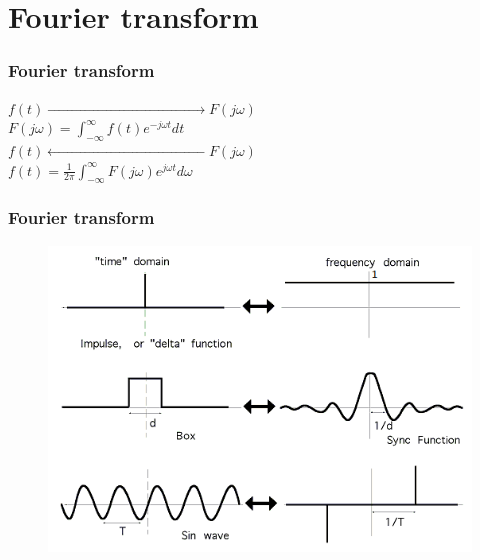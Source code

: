 \section{Fourier transform}

\begin{frame}
	\frametitle{Fourier transform}
	\vspace{-2ex}
	\begin{center}
		\Large{
		$f(t)\xrightarrow{\qquad \qquad \qquad \qquad \qquad \qquad \qquad \qquad}F(j\omega)$\\
		$F(j\omega) = \int_{-\infty}^{\infty} f(t)e^{-j\omega t} dt$\\
		\bigskip
		$f(t)\xleftarrow{\qquad \qquad \qquad \qquad \qquad \qquad \qquad \qquad}F(j\omega)$\\
		$f(t) = \frac{1}{2\pi} \int_{-\infty}^{\infty} F(j\omega) e^{j\omega t} d\omega$}
	\end{center}
\end{frame}

\begin{frame}
	\frametitle{Fourier transform}
	\begin{figure}
		\includegraphics[width=.8\linewidth]{fourier_examples}
	\end{figure}
\end{frame}

